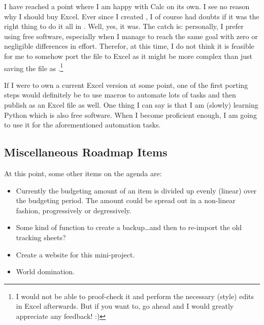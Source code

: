 I have reached a point where I am happy with Calc on its own.
I see no reason why I should buy Excel.
Ever since I created \tfn, I of course had doubts if it was the right thing to do it all in \loc.
Well, yes, it was.
The catch is: personally, I prefer using free software, especially when I manage to reach the same goal with zero or negligible differences in effort.
Therefor, at this time, I do not think it is feasible for me to somehow port the file to Excel as it might be more complex than just saving the file as .\footnote{I would not be able to proof-check it and perform the necessary (style) edits in Excel afterwards.
But if you want to, go ahead and I would greatly appreciate any feedback! :)}

If I were to own a current Excel version at some point, one of the first porting steps would definitely be to use macros to automate lots of tasks and then publish \tfn as an Excel file as well.
One thing I can say is that I am (slowly) learning Python which is also free software.
When I become proficient enough, I am going to use it for the aforementioned automation tasks.

\subsection{Miscellaneous Roadmap Items}
\label{subsec:misc-roadmap-items}

At this point, some other items on the agenda are:
\begin{itemize}
	\item Currently the budgeting amount of an item is divided up evenly (\ie linear) over the budgeting period.
	The amount could be spread out in a non-linear fashion, \eg progressively or degressively.
	\item Some kind of function to create a backup\ldots and then to re-import the old tracking sheets?
	\item Create a website for this mini-project.
	\item World domination.
\end{itemize}

